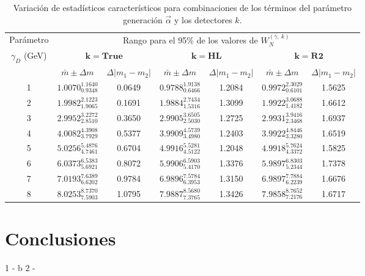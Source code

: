 \begin{table}[!t]
\centering
\scriptsize
\begin{tabular}{|c|cccccc|}
\toprule
Parámetro& \multicolumn{6}{c|}{Rango para el 95\% de los valores de $W_N^{(\gamma, ~ k)}$ }\\
$\gamma_D$ (GeV) & \multicolumn{2}{c}{$\mathbf{k = True}$} & \multicolumn{2}{c}{$\mathbf{k = HL}$} & \multicolumn{2}{c|}{$\mathbf{k = R2}$}\\
& $\bar{m} \pm \Delta m$ & $\Delta |m_1 - m_2|$ & $\bar{m} \pm \Delta m$ & $\Delta |m_1 - m_2|$ & $\bar{m} \pm \Delta m$ & $\Delta |m_1 - m_2|$\\
\midrule
1 & $1.0070^{1.1640}_{0.9348}$ & 0.0649 & $0.9788^{1.9138}_{0.6466}$ & 1.2084 & $0.9972^{2.3029}_{0.6101}$ & 1.5625 \\ \midrule
2 & $1.9982^{2.1223}_{1.9065}$ & 0.1691 & $1.9884^{2.7434}_{1.5316}$ & 1.3099 & $1.9922^{3.0688}_{1.4182}$ & 1.6612\\ \midrule
3 & $2.9952^{3.2272}_{2.8510}$ & 0.3650 & $2.9905^{3.6505}_{2.5030}$ & 1.2725 & $2.9931^{3.9416}_{2.3468}$ & 1.6937\\ \midrule
4 & $4.0082^{4.3908}_{3.7929}$ & 0.5377 & $3.9909^{4.5739}_{3.4980}$ & 1.2403 & $3.9922^{4.8446}_{3.3280}$ & 1.6519\\ \midrule
5 & $5.0256^{5.4876}_{4.7461}$ & 0.6704 & $4.9916^{5.5281}_{4.5122}$ & 1.2048 & $4.9918^{5.7624}_{4.3372}$ & 1.5825 \\ \midrule
6 & $6.0373^{6.5383}_{5.6921}$ & 0.8072 & $5.9906^{6.5903}_{5.4170}$ & 1.3376 & $5.9897^{6.8303}_{5.2344}$ & 1.7378\\ \midrule
7 & $7.0193^{7.6389}_{6.6202}$ & 0.9784 & $6.9896^{7.5784}_{6.3953}$ & 1.3150 & $6.9897^{7.7884}_{6.2239}$ & 1.6676\\ \midrule
8 & $8.0253^{8.7370}_{7.5903}$ & 1.0795 & $7.9887^{8.5680}_{7.3765}$ & 1.3426 & $7.9858^{8.7652}_{7.2176}$ & 1.6717\\
\bottomrule 
\end{tabular}
\caption{Variación de estadísticos característicos para combinaciones de los términos del parámetro generación $\vec{\alpha}$ y los detectores $k$.}
\label{Numero_de_Entradas}
\end{table}

\section{Conclusiones}
1 - b
2 - 


















